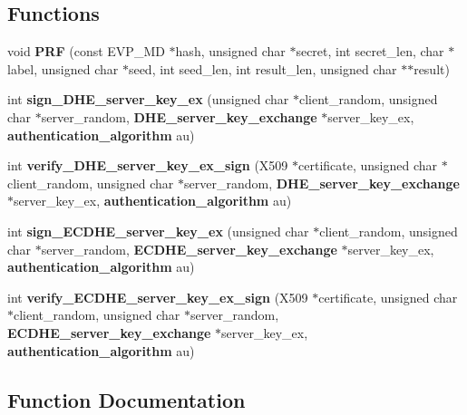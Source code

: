 \subsection*{Functions}
\begin{DoxyCompactItemize}
\item 
void {\bf P\+RF} (const E\+V\+P\+\_\+\+MD $\ast$hash, unsigned char $\ast$secret, int secret\+\_\+len, char $\ast$label, unsigned char $\ast$seed, int seed\+\_\+len, int result\+\_\+len, unsigned char $\ast$$\ast$result)
\item 
int {\bf sign\+\_\+\+D\+H\+E\+\_\+server\+\_\+key\+\_\+ex} (unsigned char $\ast$client\+\_\+random, unsigned char $\ast$server\+\_\+random, {\bf D\+H\+E\+\_\+server\+\_\+key\+\_\+exchange} $\ast$server\+\_\+key\+\_\+ex, {\bf authentication\+\_\+algorithm} au)
\item 
int {\bf verify\+\_\+\+D\+H\+E\+\_\+server\+\_\+key\+\_\+ex\+\_\+sign} (X509 $\ast$certificate, unsigned char $\ast$client\+\_\+random, unsigned char $\ast$server\+\_\+random, {\bf D\+H\+E\+\_\+server\+\_\+key\+\_\+exchange} $\ast$server\+\_\+key\+\_\+ex, {\bf authentication\+\_\+algorithm} au)
\item 
int {\bf sign\+\_\+\+E\+C\+D\+H\+E\+\_\+server\+\_\+key\+\_\+ex} (unsigned char $\ast$client\+\_\+random, unsigned char $\ast$server\+\_\+random, {\bf E\+C\+D\+H\+E\+\_\+server\+\_\+key\+\_\+exchange} $\ast$server\+\_\+key\+\_\+ex, {\bf authentication\+\_\+algorithm} au)
\item 
int {\bf verify\+\_\+\+E\+C\+D\+H\+E\+\_\+server\+\_\+key\+\_\+ex\+\_\+sign} (X509 $\ast$certificate, unsigned char $\ast$client\+\_\+random, unsigned char $\ast$server\+\_\+random, {\bf E\+C\+D\+H\+E\+\_\+server\+\_\+key\+\_\+exchange} $\ast$server\+\_\+key\+\_\+ex, {\bf authentication\+\_\+algorithm} au)
\end{DoxyCompactItemize}


\subsection{Function Documentation}
